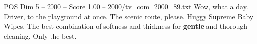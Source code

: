 \begin{textsample}{POS Dim 5 – 2000 – Score 1.00 – 2000/tv\_com\_2000\_89.txt}  \label{ex:f5_pos_065}
Wow, what a day.
Driver, to the playground at once.
The scenic route, please.
Huggy Supreme Baby Wipes.
The best combination of softness and thickness for \textbf{gentle} and thorough cleaning.
Only the best.

\end{textsample}
